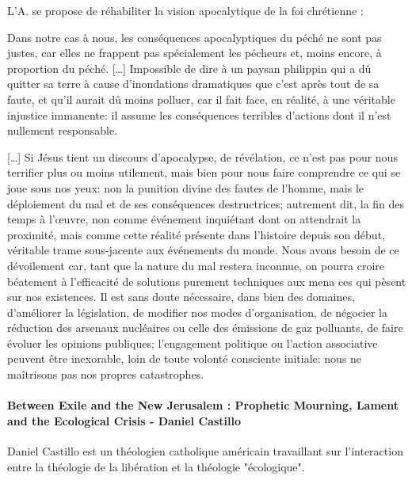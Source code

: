 L'A. se propose de réhabiliter la vision apocalytique de la foi chrétienne : 
\begin{singlequote}
Dans notre cas à nous, les conséquences apocalyptiques du péché ne sont pas justes, car elles ne frappent pas spécialement les pécheurs et, moins encore, à proportion du péché. [\ldots] Impossible de dire à un paysan philippin qui a dû quitter sa terre à cause d'inondations dramatiques que c'est après tout de sa faute, et qu'il aurait dû moins polluer, car il fait face, en réalité, à une véritable injustice immanente: il assume les conséquences terribles d'actions dont il n'est nullement responsable.

[\ldots] Si Jésus tient un discours d'apocalypse, de révélation, ce n'est pas pour nous terrifier plus ou moins utilement, mais bien pour nous faire comprendre ce qui se joue sous nos yeux: non la punition divine des fautes de l'homme, mais le déploiement du mal et de ses conséquences destructrices; autrement dit, la fin des temps à l'œuvre, non comme événement inquiétant dont on attendrait la proximité, mais comme cette réalité présente dans l'histoire depuis son début, véritable trame sous-jacente aux événements du monde. Nous avons besoin de ce dévoilement car, tant que la nature du mal restera inconnue, on pourra croire béatement à l'efficacité de solutions purement techniques aux mena ces qui pèsent sur nos existences. Il est sans doute nécessaire, dans bien des domaines, d'améliorer la législation, de modifier nos modes d'organisation, de négocier la réduction des arsenaux nucléaires ou celle des émissions de gaz polluants, de faire évoluer les opinions publiques; l'engagement politique ou l'action associative peuvent être  inexorable, loin de toute volonté consciente initiale: nous ne maîtrisons pas nos propres catastrophes. \cite[p.xx]{candiard_quelques_2022} 
\end{singlequote}


\paragraph{Between Exile and the New Jerusalem : Prophetic Mourning, Lament and
the Ecological Crisis - Daniel Castillo} Daniel Castillo est un théologien catholique américain travaillant sur l'interaction entre la théologie de la libération et la théologie "écologique". 

